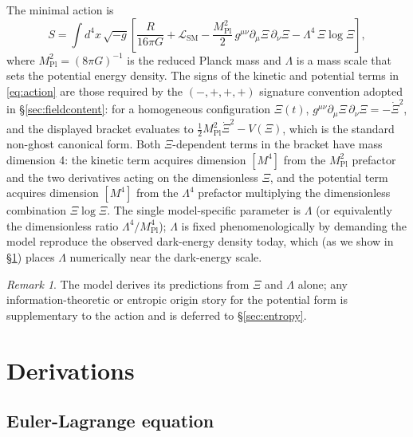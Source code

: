 \documentclass[11pt,reqno]{amsart}
\theoremstyle{plain}
\theoremstyle{definition}
\theoremstyle{remark}
\newtheorem*{remark}{Remark}
\newcommand{\Pl}{\mathrm{Pl}}
\newcommand{\SM}{\mathrm{SM}}
\begin{document}
The minimal action is
\begin{equation}\label{eq:action}
  S = \int d^{4}x\,\sqrt{-g}\left[\frac{R}{16\pi G}
     + \mathcal{L}_{\SM}
     - \frac{M_\Pl^{2}}{2}\,g^{\mu\nu}\partial_\mu\Xi\,\partial_\nu\Xi
     - \Lambda^{4}\,\Xi\log\Xi\right],
\end{equation}
where $M_\Pl^{2} = (8\pi G)^{-1}$ is the reduced Planck mass and
$\Lambda$ is a mass scale that sets the potential energy density. The
signs of the kinetic and potential terms in \eqref{eq:action} are those
required by the $(-,+,+,+)$ signature convention adopted in
\S\ref{sec:fieldcontent}: for a homogeneous configuration $\Xi(t)$,
$g^{\mu\nu}\partial_\mu\Xi\,\partial_\nu\Xi = -\dot\Xi^{2}$, and the
displayed bracket evaluates to $\tfrac{1}{2}M_\Pl^{2}\dot\Xi^{2} -
V(\Xi)$, which is the standard non-ghost canonical form. Both
$\Xi$-dependent terms in the bracket have mass dimension 4: the kinetic
term acquires dimension $[M^{4}]$ from the $M_\Pl^{2}$ prefactor and the
two derivatives acting on the dimensionless $\Xi$, and the potential
term acquires dimension $[M^{4}]$ from the $\Lambda^{4}$ prefactor
multiplying the dimensionless combination $\Xi\log\Xi$. The single
model-specific parameter is $\Lambda$ (or equivalently the dimensionless
ratio $\Lambda^{4}/M_\Pl^{4}$); $\Lambda$ is fixed phenomenologically by
demanding the model reproduce the observed dark-energy density today,
which (as we show in \S\ref{sec:derivations}) places $\Lambda$
numerically near the dark-energy scale.

\begin{remark}
The model derives its predictions from $\Xi$ and $\Lambda$ alone; any
information-theoretic or entropic origin story for the potential form is
supplementary to the action and is deferred to \S\ref{sec:entropy}.
\end{remark}

\section{Derivations}\label{sec:derivations}

\subsection{Euler-Lagrange equation}
\end{document}
